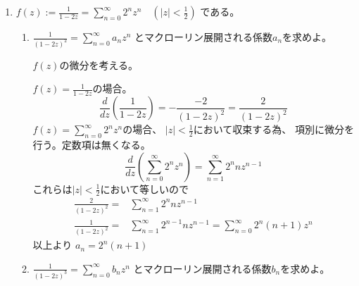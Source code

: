\documentclass[12pt,b5paper]{ltjsarticle}
\begin{document}
\begin{enumerate}
 \item %

       $\displaystyle
       f(z) := \frac{1}{1-2z}
       =\sum_{n=0}^{\infty}2^nz^n
       \quad (\lvert z \rvert < \frac{1}{2})$
       である。

       \hrulefill
       \begin{enumerate}\renewcommand{\theenumii}{\arabic{enumii}}
        \item %

             $\displaystyle
                \frac{1}{(1-2z)^2}
                = \sum_{n=0}^{\infty}a_nz^n$
              とマクローリン展開される係数$a_n$を求めよ。

              \dotfill

              $f(z)$の微分を考える。

              $f(z)=\frac{1}{1-2z}$の場合。
              \begin{equation}
               \frac{d}{dz}\left( \frac{1}{1-2z} \right)
                = -\frac{-2}{(1-2z)^2}
                = \frac{2}{(1-2z)^2}
              \end{equation}
              $f(z)=\sum_{n=0}^{\infty}2^nz^n$の場合、
              $\rvert z \lvert < \frac{1}{2}$において収束する為、
              項別に微分を行う。定数項は無くなる。
              \begin{equation}
               \frac{d}{dz}\left( \sum_{n=0}^{\infty}2^nz^n \right)
                = \sum_{n=1}^{\infty}2^nnz^{n-1}
              \end{equation}
              これらは$\rvert z \lvert < \frac{1}{2}$において等しいので
              \begin{align}
                \frac{2}{(1-2z)^2}
               =& \sum_{n=1}^{\infty}2^nnz^{n-1}\\
                \frac{1}{(1-2z)^2}
               =& \sum_{n=1}^{\infty}2^{n-1}nz^{n-1}
               = \sum_{n=0}^{\infty}2^{n}(n+1)z^{n}
              \end{align}
%
              以上より \underline{$a_n=2^n(n+1)$}
              
              \hrulefill
        \item %

              $\displaystyle
                \frac{1}{(1-2z)^3}
                = \sum_{n=0}^{\infty}b_nz^n$
              とマクローリン展開される係数$b_n$を求めよ。

              \dotfill


\end{enumerate}
\end{enumerate}
\end{document}
